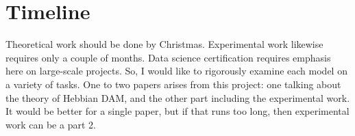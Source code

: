 \documentclass{article}
\theoremstyle{definition}
\begin{document}
\section{Timeline}\label{sec:timeline}

Theoretical work should be done by Christmas. Experimental work likewise
requires only a couple of months. Data science certification requires emphasis
here on large-scale projects. So, I would like to rigorously examine
each model on a variety of tasks. One to two papers arises from this project:
one talking about the theory of Hebbian DAM, and the other part including
the experimental work. It would be better for a single paper, but if that
runs too long, then experimental work can be a part 2.

\printbibliography
\end{document}
